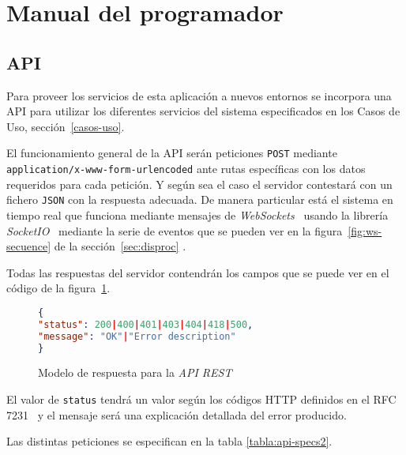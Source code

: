 \section{Manual del programador}

\subsection{API}\label{sec:api}
Para proveer los servicios de esta aplicación a nuevos entornos se incorpora una API para utilizar los diferentes servicios del sistema especificados en los Casos de Uso, sección~\ref{casos-uso}.

El funcionamiento general de la API serán peticiones \texttt{POST} mediante \texttt{application/x-www-form-urlencoded} ante rutas específicas con los datos requeridos para cada petición. Y según sea el caso el servidor contestará con un fichero \texttt{JSON} con la respuesta adecuada. De manera particular está el sistema en tiempo real que funciona mediante mensajes de \textit{WebSockets}~\cite{wiki:websocket} usando la librería \textit{SocketIO}~\cite{tool:socketio} mediante la serie de eventos que se pueden ver en la figura~\ref{fig:ws-secuence}
de la sección~\ref{sec:disproc} .

Todas las respuestas del servidor contendrán los campos que se puede ver en el código de la figura~\ref{code:api_response}.
\begin{figure}
	\centering
	\begin{lstlisting}[language=JSON]
{
"status": 200|400|401|403|404|418|500,
"message": "OK"|"Error description"
}
	\end{lstlisting}
	\caption{Modelo de respuesta para la \textit{API REST}}
	\label{code:api_response}
\end{figure}


El valor de \texttt{status} tendrá un valor según los códigos HTTP definidos en el RFC 7231~\cite{RFC7231} y el mensaje será una explicación detallada del error producido.

Las distintas peticiones se especifican en la tabla \ref{tabla:api-specs2}.

